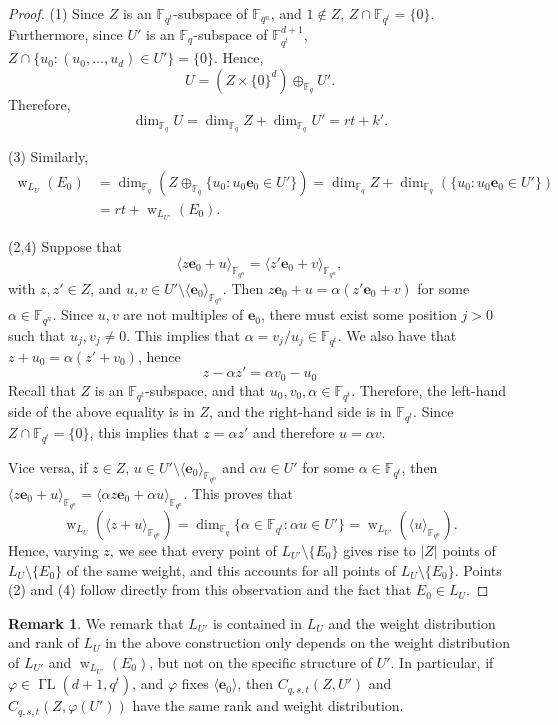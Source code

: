 \documentclass[11pt]{article}
\DeclareMathOperator{\GammaL}{\Gamma\mathrm{L}}
\theoremstyle{definition}
\newtheorem{remark}[theorem]{Remark}
\newcommand{\fqn}{\mathbb{F}_{q^n}}
\newcommand{\F}{{\mathbb F}}
\newcommand{\fq}{{\mathbb F}_{q}}
\newcommand{\e}{\mathbf e}
\DeclareMathOperator{\ww}{w}
\begin{document}
\begin{proof}
(1) Since $Z$ is an $\F_{q^t}$-subspace of $\fqn$, and $1 \notin Z$, $Z \cap \F_{q^t} = \{ 0 \}$.
Furthermore, since $U'$ is an $\F_q$-subspace of $\F_{q^t}^{d+1}$, $Z \cap \{u_0 : (u_0, \dots, u_d) \in U' \} = \{ 0 \}$.
Hence,
\[
 U = (Z \times \{ 0 \}^d) \oplus_{\fq} U'.
\]
Therefore,
\[
 \dim_{\fq} U = \dim_{\fq} Z + \dim_{\fq} U' = rt + k'.
\]

(3) Similarly, 
\begin{align*}
 \ww_{L_{U}}(E_0)
 & = \dim_{\fq} \left( Z \oplus_{\fq} \{ u_0 : u_0 \e_0 \in U' \} \right)
 = \dim_{\fq} Z + \dim_{\fq}(\{ u_0 : u_0 \e_0 \in U' \}) \\
 & = r t + \ww_{L_{U'}}(E_0).
\end{align*}


(2,4)
Suppose that
\[
 \langle z \e_0 + u \rangle_{\fqn} = \langle z' \e_0 + v \rangle_{\fqn},
\]
with $z, z' \in Z$, and $u, v \in U' \setminus \langle \e_0 \rangle_{\fqn}$.
Then $z \e_0 + u = \alpha (z' \e_0 + v)$ for some $\alpha \in \fqn$.
Since $u, v$ are not multiples of $\e_0$, there must exist some position $j > 0$ such that $u_j, v_j \neq 0$.
This implies that $\alpha = v_j / u_j \in \F_{q^t}$.
We also have that $z + u_0 = \alpha(z' + v_0)$, hence
\[
 z - \alpha z' = \alpha v_0 - u_0
\]
Recall that $Z$ is an $\F_{q^t}$-subspace, and that $u_0, v_0, \alpha \in \F_{q^t}$.
Therefore, the left-hand side of the above equality is in $Z$, and the right-hand side is in $\F_{q^t}$.
Since $Z \cap \F_{q^t} = \{0\}$, this implies that $z = \alpha z'$ and therefore $u = \alpha v$.

Vice versa, if $z \in Z$, $u \in U' \setminus \langle \e_0 \rangle_{\fqn}$ and $\alpha u \in U'$ for some $\alpha \in \F_{q^t}$, then $\langle z \e_0 + u \rangle_{\fqn} = \langle \alpha z \e_0 + \alpha u \rangle_{\fqn}$.
This proves that
\[
 \ww_{L_U}(\langle z + u \rangle_{\fqn})
 = \dim_{\fq} \{ \alpha \in \F_{q^t} : \alpha u \in U' \}
 = \ww_{L_{U'}}(\langle u \rangle_{\fqn}).
\]
Hence, varying $z$, we see that every point of $L_{U'} \setminus \{ E_0 \}$ gives rise to $|Z|$ points of $L_U \setminus \{ E_0 \}$ of the same weight, and this accounts for all points of $L_U \setminus \{ E_0 \}$.
Points (2) and (4) follow directly from this observation and the fact that $E_0 \in L_U$.
\end{proof}

\begin{remark}
We remark that $L_{U'}$ is contained in $L_U$ and the weight distribution and rank of $L_U$ in the above construction only depends on the weight distribution of $L_{U'}$ and $\ww_{L_{U'}}(E_0)$, but not on the specific structure of $U'$.
In particular, if $\varphi \in \GammaL(d+1,q^t)$, and $\varphi$ fixes $\langle \e_0 \rangle$, then $C_{q,s,t}(Z,U')$ and $C_{q,s,t}(Z,\varphi(U'))$ have the same rank and weight distribution.
\end{remark}
\end{document}
